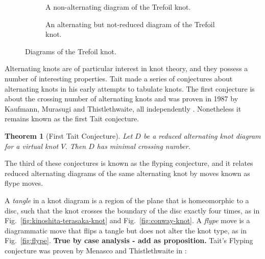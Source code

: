 \documentclass[12pt]{report}
\newcommand{\notered}[1]{{\color{Red} \textbf{#1}}}
\newtheorem*{theorem}{Theorem}
\theoremstyle{upright}
\begin{document}
\begin{figure}[hbt!]
	\centering
	\hspace*{\fill}
	\begin{subfigure}[b]{0.4 \textwidth}
		\centering
		\def\svgscale{0.23}
		
		\caption{A non-alternating diagram of the Trefoil knot.}
		\label{fig:trefoil-nonalternating}
	\end{subfigure}
	\hspace*{\fill} \hspace*{\fill}	\hspace*{\fill}
	\begin{subfigure}[b]{0.4 \textwidth}
		\centering
		\def\svgscale{0.23}
		
		\caption{An alternating but not-reduced diagram of the Trefoil knot.}
		\label{fig:trefoil-nugatory}
	\end{subfigure}
	\hspace*{\fill} 
	\caption{Diagrams of the Trefoil knot.}
	\label{fig:trefoil-diagrams}
\end{figure}

Alternating knots are of particular interest in knot theory, and they possess a number of interesting properties. Tait made a series of conjectures about alternating knots in his early attempts to tabulate knots. The first conjecture is about the crossing number of alternating knots and was proven in 1987 by Kaufmann, Murasugi and Thistlethwaite, all independently \cite{state-models-jones-polynomial, jones-polynomials-classical-conjectures, spanning-tree-expansion-jones-polynomial}. Nonetheless it remains known as the first Tait conjecture.

\begin{theorem}[First Tait Conjecture]
Let $D$ be a reduced alternating knot diagram for a virtual knot $V$. Then $D$ has minimal crossing number.
\end{theorem}

The third of these conjectures is known as the flyping conjecture, and it relates reduced alternating diagrams of the same alternating knot by moves known as flype moves.

A \textit{tangle} in a knot diagram is a region of the plane that is homeomorphic to a disc, such that the knot crosses the boundary of the disc exactly four times, as in Fig.~\ref{fig:kinoshita-terasaka-knot} and Fig.~\ref{fig:conway-knot}. A \textit{flype} move is a diagrammatic move that flips a tangle but does not alter the knot type, as in Fig.~\ref{fig:flype}. \notered{True by case analysis - add as proposition.} Tait's Flyping conjecture was proven by Menasco and Thistlethwaite in \cite[p. 166]{classification-alternating-links}:
\end{document}
